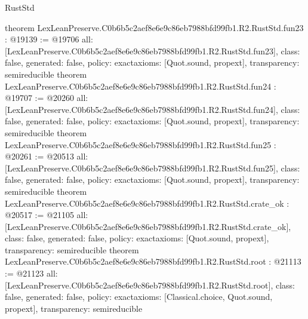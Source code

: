 \begin{lexlean}{RustStd}
\begin{coremodule}
{}
theorem LexLeanPreserve.C0b6b5c2aef8e6e9c86eb7988bfd99fb1.R2.RustStd.fun23 : @19139 := @19706 {
  all: [LexLeanPreserve.C0b6b5c2aef8e6e9c86eb7988bfd99fb1.R2.RustStd.fun23],
  class: false,
  generated: false,
  policy: exact{axioms: [Quot.sound, propext]},
  transparency: semireducible
}
theorem LexLeanPreserve.C0b6b5c2aef8e6e9c86eb7988bfd99fb1.R2.RustStd.fun24 : @19707 := @20260 {
  all: [LexLeanPreserve.C0b6b5c2aef8e6e9c86eb7988bfd99fb1.R2.RustStd.fun24],
  class: false,
  generated: false,
  policy: exact{axioms: [Quot.sound, propext]},
  transparency: semireducible
}
theorem LexLeanPreserve.C0b6b5c2aef8e6e9c86eb7988bfd99fb1.R2.RustStd.fun25 : @20261 := @20513 {
  all: [LexLeanPreserve.C0b6b5c2aef8e6e9c86eb7988bfd99fb1.R2.RustStd.fun25],
  class: false,
  generated: false,
  policy: exact{axioms: [Quot.sound, propext]},
  transparency: semireducible
}
theorem LexLeanPreserve.C0b6b5c2aef8e6e9c86eb7988bfd99fb1.R2.RustStd.crate_ok : @20517 := @21105 {
  all: [LexLeanPreserve.C0b6b5c2aef8e6e9c86eb7988bfd99fb1.R2.RustStd.crate_ok],
  class: false,
  generated: false,
  policy: exact{axioms: [Quot.sound, propext]},
  transparency: semireducible
}
theorem LexLeanPreserve.C0b6b5c2aef8e6e9c86eb7988bfd99fb1.R2.RustStd.root : @21113 := @21123 {
  all: [LexLeanPreserve.C0b6b5c2aef8e6e9c86eb7988bfd99fb1.R2.RustStd.root],
  class: false,
  generated: false,
  policy: exact{axioms: [Classical.choice, Quot.sound, propext]},
  transparency: semireducible
}


\end{coremodule}
\end{lexlean}
